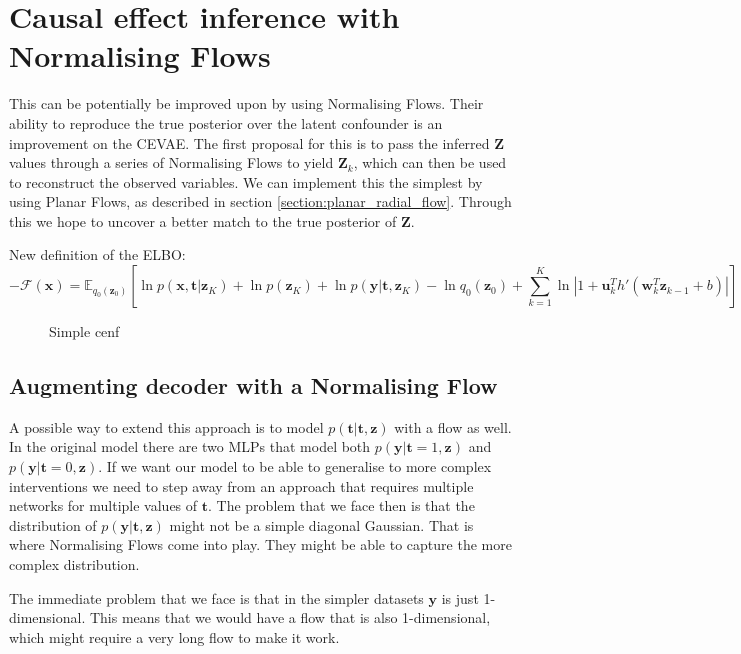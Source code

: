 \documentclass{report}
\newcommand{\bt}{\mathbf{t}}
\newcommand{\bu}{\mathbf{u}}
\newcommand{\bw}{\mathbf{w}}
\newcommand{\bx}{\mathbf{x}}
\newcommand{\by}{\mathbf{y}}
\newcommand{\bZ}{\mathbf{Z}}
\newcommand{\bz}{\mathbf{z}}
\begin{document}
\section{Causal effect inference with Normalising Flows}
This can be potentially be improved upon by using Normalising Flows. Their ability to reproduce the true posterior over the latent confounder is an improvement on the CEVAE. The first proposal for this is to pass the inferred $\bZ$ values through a series of Normalising Flows to yield $\bZ_k$, which can then be used to reconstruct the observed variables. We can implement this the simplest by using Planar Flows, as described in section \ref{section:planar_radial_flow}. Through this we hope to uncover a better match to the true posterior of $\bZ$.

\noindent
New definition of the ELBO:
\begin{equation}
    -\mathcal{F}(\bx) = \mathbb{E}_{q_0(\bz_0)}\left[\ln p(\bx, \bt | \bz_K) + \ln p(\bz_K) + \ln p(\by |\bt, \bz_K) - \ln q_0(\bz_0) + \sum\limits^K_{k=1} \ln \left| 1 + \bu_k^Th'(\bw^T_k\bz_{k-1} + b)\right| \right]
\end{equation}


\begin{figure}
    \centering
    
    \caption{Simple cenf}
    \label{fig:cenf_with_vae}
\end{figure}

\subsection{Augmenting decoder with a Normalising Flow}
A possible way to extend this approach is to model $p(\bt|\bt,\bz)$ with a flow as well. In the original model there are two MLPs that model both $p(\by|\bt=1,\bz)$ and $p(\by|\bt=0,\bz)$. If we want our model to be able to generalise to more complex interventions we need to step away from an approach that requires multiple networks for multiple values of $\bt$. The problem that we face then is that the distribution of $p(\by|\bt,\bz)$ might not be a simple diagonal Gaussian. That is where Normalising Flows come into play. They might be able to capture the more complex distribution. 

The immediate problem that we face is that in the simpler datasets $\by$ is just 1-dimensional. This means that we would have a flow that is also 1-dimensional, which might require a very long flow to make it work.



\end{document}
